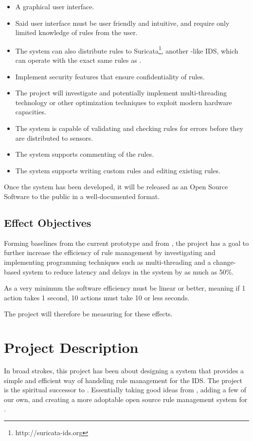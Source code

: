 \begin{itemize}
\item A graphical user interface.
\item Said user interface must be user friendly and intuitive, and require only
limited knowledge of \snort{} rules from the user.
\item The system can also distribute rules to
Suricata\footnote{http://suricata-ids.org}, another \snort{}-like IDS, which
can operate with the exact same rules as \snort{}.
\item Implement security features that ensure confidentiality of rules.
\item The project will investigate and potentially implement multi-threading
technology or other optimization techniques to exploit modern hardware
capacities.
\item The system is capable of validating and checking rules for errors before
they are distributed to sensors.
\item The system supports commenting of the rules.
\item The system supports writing custom rules and editing existing rules.
\end{itemize}
Once the system has been developed, it will be released as an Open Source Software to the
public in a well-documented format.
\subsection{Effect Objectives}
Forming baselines from the current prototype \bhtb{} and from \snortmanager{},
the project has a goal to further increase the efficiency of rule management by investigating and
implementing programming techniques such as multi-threading and a change-based system to
reduce latency and delays in the system by as much as 50\%.

As a very minimum the software efficiency must be linear or better, meaning if 1
action takes 1 second, 10 actions must take 10 or less seconds.

The project will therefore be measuring for these effects.

\section{Project Description}
In broad strokes, this project has been about designing a system that provides a
simple and efficient way of handeling rule management for the \snort{} IDS. The
project is the spiritual successor to \bhtb{}. Essentially taking good ideas
from \bhtb{}, adding a few of our own, and creating a more adoptable open source
rule management system for \snort{}.

